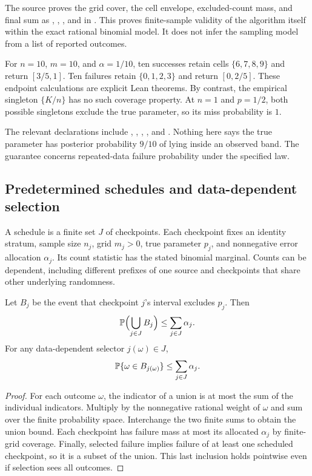 The source proves the grid cover, the cell envelope, excluded-count mass, and
final sum as , ,
, and  in
. This proves finite-sample validity of the
algorithm itself within the exact rational binomial model. It does not infer the
sampling model from a list of reported outcomes.

\begin{example}
For $n=10$, $m=10$, and $\alpha=1/10$, ten successes retain cells
$\{6,7,8,9\}$ and return $[3/5,1]$. Ten failures retain
$\{0,1,2,3\}$ and return $[0,2/5]$. These endpoint calculations are explicit
Lean theorems. By contrast, the empirical singleton $\{K/n\}$ has no such
coverage property. At $n=1$ and $p=1/2$, both possible singletons exclude the
true parameter, so its miss probability is $1$.
\end{example}

The relevant declarations include ,
, ,
, and
. Nothing here says the true
parameter has posterior probability $9/10$ of lying inside an observed band.
The guarantee concerns repeated-data failure probability under the specified
law.

\subsection{Predetermined schedules and data-dependent selection}

A schedule is a finite set $J$ of checkpoints. Each checkpoint fixes an
identity stratum, sample size $n_j$, grid $m_j>0$, true parameter $p_j$, and
nonnegative error allocation $\alpha_j$. Its count statistic has the stated
binomial marginal. Counts can be dependent, including different prefixes of
one source and checkpoints that share other underlying randomness.

\begin{theorem}
Let $B_j$ be the event that checkpoint $j$'s interval excludes $p_j$. Then
\[
 \mathbb P\Bigl(\bigcup_{j\in J}B_j\Bigr)
 \leq\sum_{j\in J}\alpha_j.
\]
For any data-dependent selector $j(\omega)\in J$,
\[
 \mathbb P\{\omega\in B_{j(\omega)}\}\leq\sum_{j\in J}\alpha_j.
\]
\end{theorem}
\begin{proof}
For each outcome $\omega$, the indicator of a union is at most the sum of the
individual indicators. Multiply by the nonnegative rational weight of
$\omega$ and sum over the finite probability space. Interchange the two finite
sums to obtain the union bound. Each checkpoint has failure mass at most its
allocated $\alpha_j$ by finite-grid coverage. Finally, selected failure implies
failure of at least one scheduled checkpoint, so it is a subset of the union.
This last inclusion holds pointwise even if selection sees all outcomes.
\end{proof}

